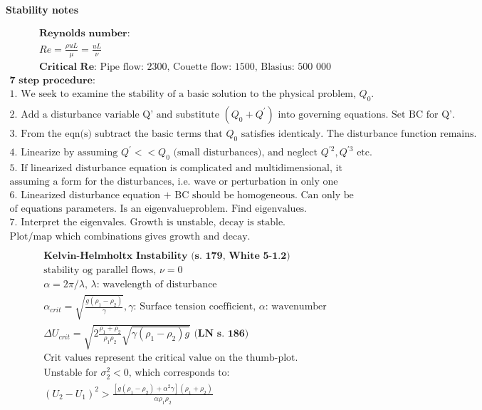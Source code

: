 \documentclass[10pt, a4paper]{article}
\begin{document}
\newpage
\begin{center}
    \Large
    \textbf{Stability notes}
    \vspace{0.5cm}
\end{center}
\begin{gather*}
    \textbf{Reynolds number:} \\
    Re = \frac{\rho u L}{\mu} = \frac{u L}{\nu}\\
    \textbf{Critical Re: }
    \text{Pipe flow: 2300, Couette flow: 1500, Blasius: 500 000}
\end{gather*}
\begin{gather*}
    \textbf{7 step procedure:} \\
    \text{1. We seek to examine the stability of a basic solution to the physical problem, $Q_{0}$.} \\
    \text{2. Add a disturbance variable Q' and substitute $(Q_{0} + Q^{'})$ into governing equations. Set BC for Q'.} \\
    \text{3. From the eqn(s) subtract the basic terms that $Q_{0}$ satisfies identicaly. The disturbance function remains.} \\
    \text{4. Linearize by assuming $Q^{'} << Q_{0}$ (small disturbances), and neglect $Q^{'2}, Q^{'3}$ etc.} \\
    \text{5. If linearized disturbance equation is complicated and multidimensional, it can be simplyfied by } \\
    \text{assuming a form for the disturbances, i.e. wave or perturbation in only one direction.} \\
    \text{6. Linearized disturbance equation + BC should be homogeneous. Can only be solved for certain specific values }\\
    \text{of equations parameters. Is an eigenvalueproblem. Find eigenvalues.}\\
    \text{7. Interpret the eigenvales. Growth is unstable, decay is stable.} \\
    \text{Plot/map which combinations gives growth and decay.}\\
\end{gather*}
\begin{gather*}
    \textbf{Kelvin-Helmholtx Instability (s. 179, White 5-1.2)} \\
    \text{stability og parallel flows, $\nu = 0$ } \\
    \alpha = 2\pi/\lambda \text{, $\lambda$: wavelength of disturbance} \\
    \alpha_{crit}=\sqrt{\frac{g(\rho_1-\rho_2)}{\gamma}}, \gamma \text{: Surface tension coefficient, $\alpha$: wavenumber} \\
    \Delta U_{crit} = \sqrt{2\frac{\rho_1+\rho_2}{\rho_1 \rho_2}\sqrt{\gamma (\rho_1 - \rho_2)g}} \textbf{ (LN s. 186)} \\
    \text{Crit values represent the critical value on the thumb-plot.} \\
    \text{Unstable for $\sigma_2^2 < 0$, which corresponds to: } \\
    (U_2 - U_1)^2 > \frac{[g(\rho_1-\rho_2) + \alpha^2\gamma](\rho_1 + \rho_2)}{\alpha \rho_1 \rho_2}
\end{gather*}
\end{document}
